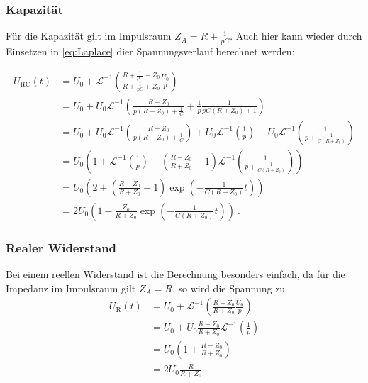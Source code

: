 \subsubsection{Kapazität}
Für die Kapazität gilt im Impulsraum $Z_A = R + \frac{1}{pC}$. Auch hier kann wieder durch Einsetzen in \eqref{eq:Laplace} dier Spannungsverlauf berechnet werden:

\begin{align*}
	U_\text{RC}(t) 
	&= U_0 + \mathcal{L}^{-1}\left(\frac{R+ \frac{1}{pC}-Z_0}{R+ \frac{1}{pC}+Z_0}\frac{U_0}{p}\right) \\
	&= U_0 + U_0 \mathcal{L}^{-1} \left( \frac{R-Z_0}{p(R+Z_0) +  \frac{1}{C}}   
	+ \frac{1}{p} \frac{1}{pC(R+Z_0) +1 } \right) \\
	&= U_0 + U_0\mathcal{L}^{-1} \left( \frac{R-Z_0}{p(R+Z_0) +  \frac{1}{C}} \right) + U_0  \mathcal{L}^{-1} \left( \frac{1}{p} \right) - U_0 \mathcal{L}^{-1} \left( \frac{1}{p + \frac{1}{C(R+Z_0)}} \right) \\
		&= U_0\left( 1+  \mathcal{L}^{-1} \left( \frac{1}{p}\right) +  \left(\frac{R-Z_0}{R+Z_0}-1\right) \mathcal{L}^{-1} \left( \frac{1}{p + \frac{1}{C(R+Z_0)}} \right) \right) \\
		&= U_0\left(2 +  \left(\frac{R-Z_0}{R+Z_0}-1\right) \exp \left( - \frac{1}{C(R+Z_0)} t\right)  \right) \\
	&= 2U_0\left(1 -  \frac{Z_0}{R+Z_0} \exp \left( - \frac{1}{C(R+Z_0)} t\right)  \right) \ .
\end{align*}

\subsubsection{Realer Widerstand}
Bei einem reellen Widerstand ist die Berechnung besonders einfach, da für die Impedanz im Impulsraum gilt $Z_A = R$, so wird die Spannung zu
\begin{align*}
	U_\text{R}(t) 
	&= U_0 + \mathcal{L}^{-1}\left(\frac{R -Z_0}{R +Z_0}\frac{U_0}{p}\right) \\
	&= U_0 + U_0\frac{R -Z_0}{R +Z_0} \mathcal{L}^{-1}\left(\frac{1}{p} \right) \\
	&= U_0\left(1 +  \frac{R -Z_0}{R +Z_0} \right) \\
	&= 2 U_0 \frac{R}{R+Z_0} \ .
\end{align*}


